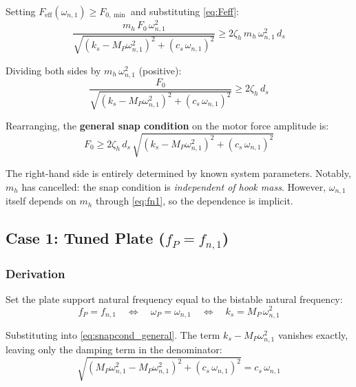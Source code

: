 \documentclass[11pt,letterpaper]{article}
\begin{document}
Setting $F_{\mathrm{eff}}(\omega_{n,1}) \geq F_{0,\min}$ and substituting
\cref{eq:Feff}:
\begin{equation}
  \frac{m_h\,F_0\,\omega_{n,1}^2}{\sqrt{(k_s - M_P\omega_{n,1}^2)^2
    + (c_s\,\omega_{n,1})^2}}
  \geq
  2\zeta_h\,m_h\,\omega_{n,1}^2\,d_s
  \label{eq:snapineq}
\end{equation}

Dividing both sides by $m_h\,\omega_{n,1}^2$ (positive):
\begin{equation}
  \frac{F_0}{\sqrt{(k_s - M_P\omega_{n,1}^2)^2
    + (c_s\,\omega_{n,1})^2}}
  \geq 2\zeta_h\,d_s
  \label{eq:snapcond_general}
\end{equation}

Rearranging, the \textbf{general snap condition} on the motor force amplitude is:
\begin{equation}
  \boxed{
  F_0
  \geq
  2\zeta_h\,d_s\,\sqrt{(k_s - M_P\omega_{n,1}^2)^2 + (c_s\,\omega_{n,1})^2}
  }
  \label{eq:F0_general}
\end{equation}

The right-hand side is entirely determined by known system parameters. Notably,
$m_h$ has cancelled: the snap condition is \emph{independent of hook mass}.
However, $\omega_{n,1}$ itself depends on $m_h$ through \cref{eq:fn1}, so the
dependence is implicit.

\subsection{Case 1: Tuned Plate (\texorpdfstring{$f_P = f_{n,1}$}{fP = fn1})}
\label{ssec:case1}

\subsubsection{Derivation}

Set the plate support natural frequency equal to the bistable natural frequency:
\begin{equation}
  f_P = f_{n,1}
  \quad\Longleftrightarrow\quad
  \omega_P = \omega_{n,1}
  \quad\Longleftrightarrow\quad
  k_s = M_P\,\omega_{n,1}^2
  \label{eq:tuned_cond}
\end{equation}

Substituting into \cref{eq:snapcond_general}. The term $k_s - M_P\omega_{n,1}^2$
vanishes exactly, leaving only the damping term in the denominator:
\begin{equation}
  \sqrt{(M_P\omega_{n,1}^2 - M_P\omega_{n,1}^2)^2 + (c_s\,\omega_{n,1})^2}
  = c_s\,\omega_{n,1}
  \label{eq:denom_tuned}
\end{equation}
\end{document}
